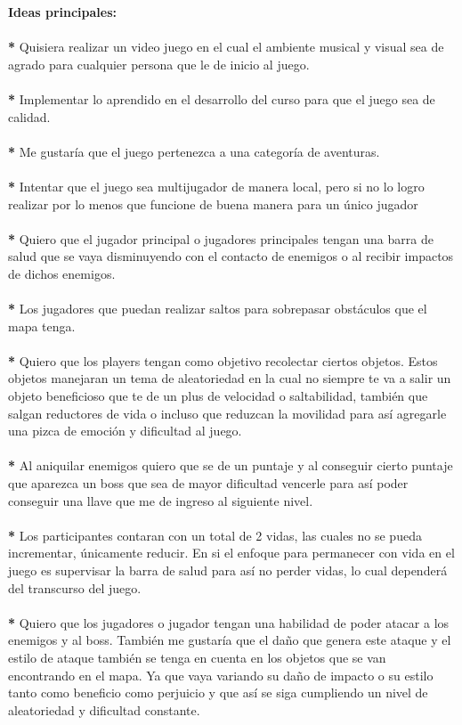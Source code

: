 \documentclass{article}
\begin{document}
\textbf{Ideas principales:} \\
\\
\textbf{*} Quisiera realizar un video juego en el cual el ambiente musical y visual sea de agrado para cualquier persona que le de inicio al juego. \\
\\
\textbf{*} Implementar lo aprendido en el desarrollo del curso para que el juego sea de calidad. \\
\\
\textbf{*} Me gustaría que el juego pertenezca a una categoría de aventuras.\\
\\
\textbf{*} Intentar que el juego sea multijugador de manera local, pero si no lo logro realizar por lo menos que funcione de buena manera para un único jugador\\
\\
\textbf{*} Quiero que el jugador principal o jugadores principales tengan una barra de salud que se vaya disminuyendo con el contacto de enemigos o al recibir impactos de dichos enemigos. \\
\\
\textbf{*} Los jugadores que puedan realizar saltos para sobrepasar obstáculos que el mapa tenga.\\ 
\\
\textbf{*} Quiero que los players tengan como objetivo recolectar ciertos objetos. Estos objetos manejaran un tema de aleatoriedad en la cual no siempre te va a salir un objeto beneficioso que te de un plus de velocidad o saltabilidad, también que salgan reductores de vida o incluso que reduzcan la movilidad para así agregarle una pizca de emoción y dificultad al juego.\\
\\
\textbf{*} Al aniquilar enemigos quiero que se de un puntaje y al conseguir cierto puntaje que aparezca un boss que sea de mayor dificultad vencerle para así poder conseguir una llave que me de ingreso al siguiente nivel. \\
\\
\textbf{*} Los participantes contaran con un total de 2 vidas, las cuales no se pueda incrementar, únicamente reducir. En si el enfoque para permanecer con vida en el juego es supervisar la barra de salud para así no perder vidas, lo cual dependerá del transcurso del juego.\\
\\
\textbf{*} Quiero que los jugadores o jugador tengan una habilidad de poder atacar a los enemigos y al boss. También me gustaría que el daño que genera este ataque y el estilo de ataque también se tenga en cuenta en los objetos que se van encontrando en el mapa. Ya que vaya variando su daño de impacto o su estilo tanto como beneficio como perjuicio y que así se siga cumpliendo un nivel de aleatoriedad y dificultad constante. \\
\end{document}
